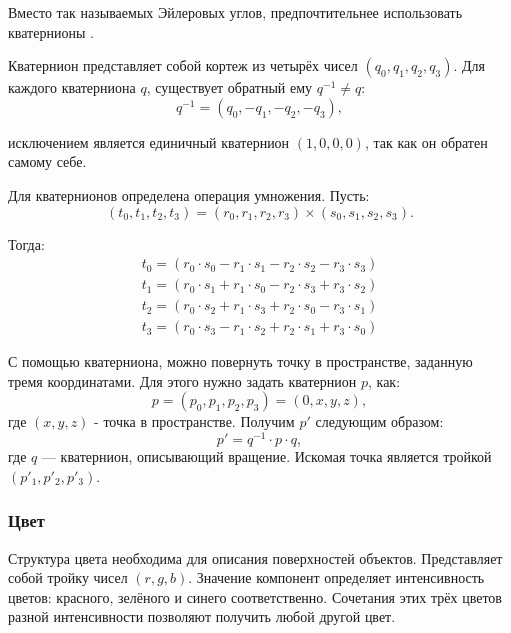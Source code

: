 Вместо так называемых Эйлеровых углов, предпочтительнее использовать кватернионы \cite{bib:quaternions}.

Кватернион представляет собой кортеж из четырёх чисел $(q_0, q_1, q_2, q_3)$. Для каждого кватерниона $q$, существует обратный ему $q^{-1}\ne q$:
\begin{equation}
	q^{-1}=(q_0, -q_1, -q_2, -q_3),
\end{equation}

исключением является единичный кватернион $(1, 0, 0, 0)$, так как он обратен самому себе.

Для кватернионов определена операция умножения. Пусть:
\begin{equation}
		(t_0, t_1, t_2, t_3) = (r_0, r_1, r_2, r_3)\times(s_0, s_1, s_2, s_3).
\end{equation}

Тогда:
\begin{subequations}
	\begin{align}
	t_0=(r_0\cdot s_0-r_1\cdot s_1-r_2\cdot s_2-r_3\cdot s_3) \\
	t_1=(r_0\cdot s_1+r_1\cdot s_0-r_2\cdot s_3+r_3\cdot s_2) \\
	t_2=(r_0\cdot s_2+r_1\cdot s_3+r_2\cdot s_0-r_3\cdot s_1) \\
	t_3=(r_0\cdot s_3-r_1\cdot s_2+r_2\cdot s_1+r_3\cdot s_0)
	\end{align}
\end{subequations}

С помощью кватерниона, можно повернуть точку в пространстве, заданную тремя координатами. Для этого нужно задать кватернион $p$, как:
\begin{equation}
	p=(p_0,p_1,p_2,p_3)=(0, x, y, z),
\end{equation}
где $(x, y, z)$ - точка в пространстве. Получим $p'$ следующим образом:
\begin{equation}
	p'=q^{-1}\cdot p\cdot q,
\end{equation}
где $q$ --- кватернион, описывающий вращение. Искомая точка является тройкой $(p'_1, p'_2, p'_3)$.

\subsubsection{Цвет}
Структура цвета необходима для описания поверхностей объектов. Представляет собой тройку чисел $(r, g, b)$. Значение компонент определяет интенсивность цветов: красного, зелёного и синего соответственно. Сочетания этих трёх цветов разной интенсивности позволяют получить любой другой цвет.

